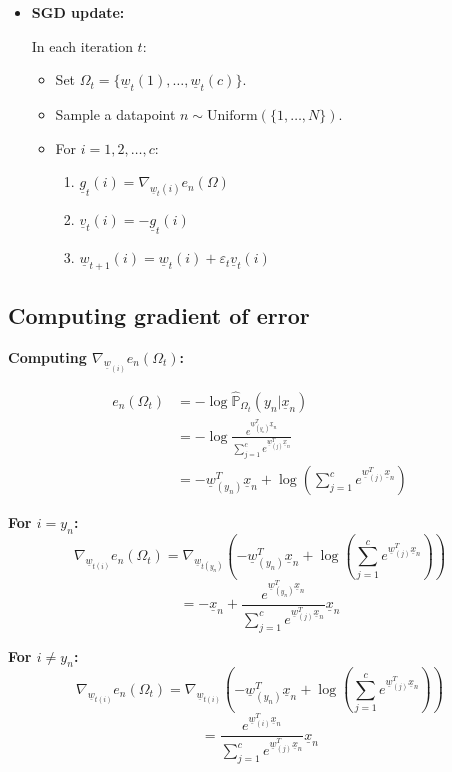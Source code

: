 \begin{definition}
\begin{itemize}
        \item \textbf{SGD update:}
        
        In each iteration \( t \):
        \begin{itemize}[left=0pt]
            \item Set \( \Omega_t = \{\underline{w}_t(1), \dots, \underline{w}_t(c)\} \).
            \item Sample a datapoint \( n \sim \text{Uniform}(\{1, \dots, N\}) \).
            \item For \( i = 1, 2, \dots, c \):
            \begin{enumerate}
                \item $\underline{g}_t(i) = \nabla_{\underline{w}_t(i)} e_n(\Omega)$
                \item $\underline{v}_t(i) = -\underline{g}_t(i)$
                \item $\underline{w}_{t+1}(i) = \underline{w}_t(i) + \varepsilon_t \underline{v}_t(i)$
            \end{enumerate}
        \end{itemize}
    \end{itemize}
\end{definition}

\subsection{Computing gradient of error}
\begin{definition}
    \textbf{Computing \( \nabla_{\underline{w}_{(i)}} e_n(\Omega_t) \):}

    \begin{align*}
        e_n(\Omega_t) &= -\log \hat{\mathbb{P}}_{\Omega_t}(y_n | \underline{x}_n) \\
        &= -\log \frac{e^{\underline{w}_{(y_n)}^T \underline{x}_n}}{\sum_{j=1}^{c} e^{\underline{w}_{(j)}^T \underline{x}_n}} \\
        &= -\underline{w}_{(y_n)}^T \underline{x}_n + \log \left( \sum_{j=1}^{c} e^{\underline{w}_{(j)}^T \underline{x}_n} \right) 
    \end{align*}
    \vspace{1em}

    \textbf{For \( i = y_n \):}
    \[
    \nabla_{\underline{w}_{t(i)}} e_n(\Omega_t) = \nabla_{\underline{w}_{t(y_n)}} \left( -\underline{w}_{(y_n)}^T \underline{x}_n + \log \left( \sum_{j=1}^{c} e^{\underline{w}_{(j)}^T \underline{x}_n} \right) \right)
    \]
    \[
    = -\underline{x}_n + \frac{e^{\underline{w}_{(y_n)}^T \underline{x}_n}}{\sum_{j=1}^{c} e^{\underline{w}_{(j)}^T \underline{x}_n}} \underline{x}_n
    \]
    \vspace{1em}

    \textbf{For \( i \neq y_n \):}
    \[
    \nabla_{\underline{w}_{t(i)}} e_n(\Omega_t) = \nabla_{\underline{w}_{t(i)}} \left( -\underline{w}_{(y_n)}^T \underline{x}_n + \log \left( \sum_{j=1}^{c} e^{\underline{w}_{(j)}^T \underline{x}_n} \right) \right)
    \]
    \[
    = \frac{e^{\underline{w}_{(i)}^T \underline{x}_n}}{\sum_{j=1}^{c} e^{\underline{w}_{(j)}^T \underline{x}_n}} \underline{x}_n
    \]
\end{definition}

